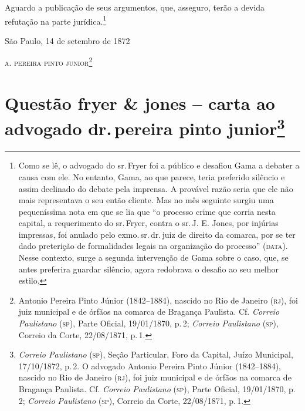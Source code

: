 Aguardo a publicação de seus argumentos, que, asseguro, terão a devida
refutação na parte jurídica.\footnote{ Como se lê, o advogado do sr.\,Fryer foi a público e desafiou Gama a debater a causa com ele. No
  entanto, Gama, ao que parece, teria preferido silêncio e assim
  declinado do debate pela imprensa. A provável razão seria que ele não
  mais representava o seu então cliente. Mas no mês seguinte surgiu uma
  pequeníssima nota em que se lia que ``o processo crime que corria nesta
  capital, a requerimento do sr.\,Fryer, contra o sr.\,J. E. Jones, por
  injúrias impressas, foi anulado pelo exmo.\,sr.\,dr.\,juiz de direito da
  comarca, por se ter dado preterição de formalidades legais na
  organização do processo'' (\textsc{data}). Nesse contexto, surge a segunda
  intervenção de Gama sobre o caso, que, se antes preferira guardar
  silêncio, agora redobrava o desafio ao seu melhor estilo.}

\begin{flushright}
São Paulo, 14 de setembro de 1872

\textsc{a. pereira pinto junior}\footnote{ Antonio Pereira Pinto Júnior
  (1842--1884), nascido no Rio de Janeiro (\textsc{rj}), foi juiz municipal e de
  órfãos na comarca de Bragança Paulista. Cf. \emph{Correio Paulistano}
  (\textsc{sp}), Parte Oficial, 19/01/1870, p.\,2; \emph{Correio Paulistano} (\textsc{sp}),
  Correio da Corte, 22/08/1871, p.\,1.}
\end{flushright}

\chapter{Questão fryer \& jones -- carta ao advogado dr.\,pereira pinto junior\footnote{\emph{Correio Paulistano} (\textsc{sp}), Seção Particular, Foro
  da Capital, Juízo Municipal, 17/10/1872, p.\,2. O advogado Antonio
  Pereira Pinto Júnior (1842--1884), nascido no Rio de Janeiro (\textsc{rj}), foi
  juiz municipal e de órfãos na comarca de Bragança Paulista. Cf.
  \emph{Correio Paulistano} (\textsc{sp}), Parte Oficial, 19/01/1870, p.\,2;
  \emph{Correio Paulistano} (\textsc{sp}), Correio da Corte, 22/08/1871, p.\,1.}} %

